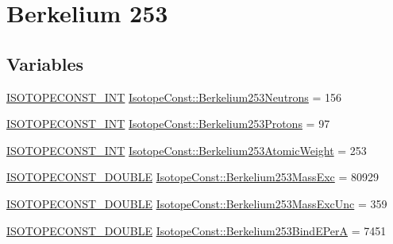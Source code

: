 \hypertarget{group___isotope_const-_berkelium-_bk253}{}\section{Berkelium 253}
\label{group___isotope_const-_berkelium-_bk253}
\subsection*{Variables}
\begin{DoxyCompactItemize}
\item 
\mbox{\hyperlink{group___isotope_const-_macros_ga5f18360b3e99483a35c32d789e62621c}{I\+S\+O\+T\+O\+P\+E\+C\+O\+N\+S\+T\+\_\+\+I\+NT}} \mbox{\hyperlink{group___isotope_const-_berkelium-_bk253_ga6c82202868ee6f2bcfc3e48b929403ea}{Isotope\+Const\+::\+Berkelium253\+Neutrons}} = 156
\item 
\mbox{\hyperlink{group___isotope_const-_macros_ga5f18360b3e99483a35c32d789e62621c}{I\+S\+O\+T\+O\+P\+E\+C\+O\+N\+S\+T\+\_\+\+I\+NT}} \mbox{\hyperlink{group___isotope_const-_berkelium-_bk253_ga885fb78d1dadf106a56cafa753b4853b}{Isotope\+Const\+::\+Berkelium253\+Protons}} = 97
\item 
\mbox{\hyperlink{group___isotope_const-_macros_ga5f18360b3e99483a35c32d789e62621c}{I\+S\+O\+T\+O\+P\+E\+C\+O\+N\+S\+T\+\_\+\+I\+NT}} \mbox{\hyperlink{group___isotope_const-_berkelium-_bk253_gab37363f7ec2747b9747f314a6d5b3693}{Isotope\+Const\+::\+Berkelium253\+Atomic\+Weight}} = 253
\item 
\mbox{\hyperlink{group___isotope_const-_macros_ga8f45a7272ce02c0b4c65c44636ed719a}{I\+S\+O\+T\+O\+P\+E\+C\+O\+N\+S\+T\+\_\+\+D\+O\+U\+B\+LE}} \mbox{\hyperlink{group___isotope_const-_berkelium-_bk253_gadd0ee39cfe383382cda4e9d72ac60c29}{Isotope\+Const\+::\+Berkelium253\+Mass\+Exc}} = 80929
\item 
\mbox{\hyperlink{group___isotope_const-_macros_ga8f45a7272ce02c0b4c65c44636ed719a}{I\+S\+O\+T\+O\+P\+E\+C\+O\+N\+S\+T\+\_\+\+D\+O\+U\+B\+LE}} \mbox{\hyperlink{group___isotope_const-_berkelium-_bk253_gae743b7eae03114b996a40470c0f863bc}{Isotope\+Const\+::\+Berkelium253\+Mass\+Exc\+Unc}} = 359
\item 
\mbox{\hyperlink{group___isotope_const-_macros_ga8f45a7272ce02c0b4c65c44636ed719a}{I\+S\+O\+T\+O\+P\+E\+C\+O\+N\+S\+T\+\_\+\+D\+O\+U\+B\+LE}} \mbox{\hyperlink{group___isotope_const-_berkelium-_bk253_ga8d58066642c94f91a84bb0270321fd5c}{Isotope\+Const\+::\+Berkelium253\+Bind\+E\+PerA}} = 7451
\item 

\end{DoxyCompactItemize}
